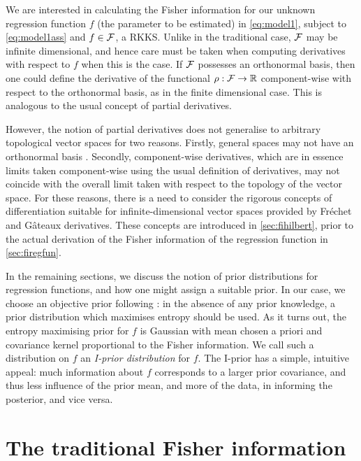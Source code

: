 \documentclass[showframe,11pt,twoside,openright]{report}
\begin{document}
\label{chapter3}

\newcommand{\funder}{\rho}  %

We are interested in calculating the Fisher information for our unknown regression function $f$ (the parameter to be estimated) in \cref{eq:model1}, subject to \cref{eq:model1ass} and $f\in{\mathcal F}$, a RKKS.
Unlike in the traditional case, ${\mathcal F}$ may be infinite dimensional, and hence care must be taken when computing derivatives with respect to $f$ when this is the case.
If ${\mathcal F}$ possesses an orthonormal basis, then one could define the derivative of the functional $\funder:\cF\to\bbR$ component-wise with respect to the orthonormal basis, as in the finite dimensional case.
This is analogous to the usual concept of   partial derivatives.

However, the notion of partial derivatives does not generalise to arbitrary topological vector spaces for two reasons.
Firstly, general spaces may not have an orthonormal basis \citep[§5, pp. 76]{tapia1971diff}.
Secondly, component-wise derivatives, which are in essence limits taken component-wise using the usual definition of derivatives, may not coincide with the overall limit taken with respect to the topology of the vector space.
For these reasons, there is a need to consider the rigorous concepts of differentiation suitable for infinite-dimensional vector spaces provided by Fréchet and Gâteaux derivatives.
These concepts are introduced in \cref{sec:fihilbert}, prior to the actual derivation of the Fisher information of the regression function in \cref{sec:firegfun}.

In the remaining sections, we discuss the notion of prior distributions for regression functions, and how one might assign a suitable prior.
In our case, we choose an objective prior following \citep{jaynes1957a,jaynes1957b,jaynes2003probability}: in the absence of any prior knowledge, a prior distribution which maximises entropy should be used.
As it turns out, the entropy maximising prior for $f$ is Gaussian with mean chosen a priori and covariance kernel proportional to the Fisher information.
We call such a distribution on $f$ an \emph{I-prior distribution} for $f$.
The I-prior has a simple, intuitive appeal: much information about $f$ corresponds to a larger prior covariance, and thus less influence of the prior mean, and more of the data, in informing the posterior, and vice versa.

\section{The traditional Fisher information}

\end{document}
